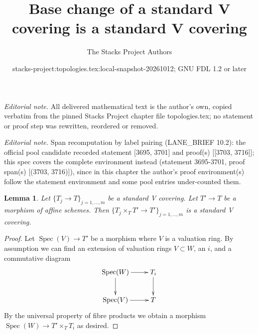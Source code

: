 \documentclass[10pt,a4paper]{amsart}
\title{Base change of a standard V covering is a standard V covering}
\author{The Stacks Project Authors}
\date{stacks-project:topologies.tex:local-snapshot-20261012; GNU FDL 1.2 or later}
\theoremstyle{plain}
\newtheorem{lemma}[subsection]{Lemma}
\theoremstyle{definition}
\theoremstyle{remark}
\numberwithin{equation}{subsection}
\def\Spec{\mathop{\mathrm{Spec}}}
\begin{document}
\maketitle
\noindent\textit{Editorial note.} All delivered mathematical text is the author's own, copied verbatim from the pinned Stacks Project chapter file topologies.tex; no statement or proof step was rewritten, reordered or removed.\par\medskip
\noindent\textit{Editorial note.} Span recomputation by label pairing (LANE\_BRIEF 10.2): the official pool candidate recorded statement [3695, 3701] and proof(s) [[3703, 3716]]; this spec covers the complete environment instead (statement 3695-3701, proof span(s) [(3703, 3716)]), since in this chapter the author's proof environment(s) follow the statement environment and some pool entries under-counted them.\par\medskip
\begin{lemma}
\label{lemma-base-change-standard-V}
Let $\{T_j \to T\}_{j = 1, \ldots, m}$ be a standard V covering.
Let $T' \to T$ be a morphism of affine schemes.
Then $\{T_j \times_T T' \to T'\}_{j = 1, \ldots, m}$ is a
standard V covering.
\end{lemma}

\begin{proof}
Let $\Spec(V) \to T'$ be a morphism where $V$ is a valuation ring.
By assumption we can find an extension of valuation rings $V \subset W$,
an $i$, and a commutative diagram
$$
\xymatrix{
\Spec(W) \ar[r] \ar[d] & T_i \ar[d] \\
\Spec(V) \ar[r] & T
}
$$
By the universal property of fibre products
we obtain a morphism $\Spec(W) \to T' \times_T T_i$
as desired.
\end{proof}
\end{document}
